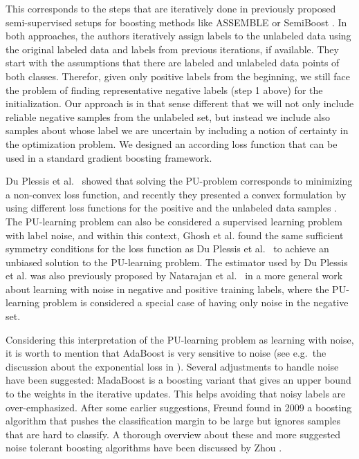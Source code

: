 This corresponds to the steps that are iteratively done in previously proposed semi-supervised setups for boosting methods like ASSEMBLE \cite{bennett2002exploiting} or SemiBoost \cite{mallapragada2009semiboost}. In both approaches, the authors iteratively assign labels to the unlabeled data using the original labeled data and labels from previous iterations, if available. They start with the assumptions that there are labeled and unlabeled data points of both classes. Therefor, given only positive labels from the beginning, we still face the problem of finding representative negative labels (step 1 above) for the initialization. Our approach is in that sense different that we will not only include reliable negative samples from the unlabeled set, but instead we include also samples about whose label we are uncertain by including a notion of certainty in the optimization problem. We designed an according loss function that can be used in a standard gradient boosting framework.

Du Plessis et al.\ \cite{plessis2014PUanalysis} showed that solving the PU-problem corresponds to minimizing a non-convex loss function, and recently they presented a convex formulation by using different loss functions for the positive and the unlabeled data samples \cite{plessis2015convex}. The PU-learning problem can also be considered a supervised learning problem with label noise, and within this context, Ghosh et al. \cite{ghosh2015making} found the same sufficient symmetry conditions for the loss function as Du Plessis et al.\ \cite{plessis2014PUanalysis} to achieve an unbiased solution to the PU-learning problem. The estimator used by Du Plessis et al. was also previously proposed by Natarajan et al.\ \cite{natarajan2013learning} in a more general work about learning with noise in negative and positive training labels, where the PU-learning problem is considered a special case of having only noise in the negative set.

Considering this interpretation of the PU-learning problem as learning with noise, it is worth to mention that AdaBoost is very sensitive to noise (see e.g.\ the discussion about the exponential loss in \cite{friedman2009elements}). Several adjustments to handle noise have been suggested: MadaBoost \cite{domingo2000madaboost} is a boosting variant that gives an upper bound to the weights in the iterative updates. This helps avoiding that noisy labels are over-emphasized. 
After some earlier suggestions, Freund found in 2009 a boosting algorithm \cite{freund2009more} that pushes the classification margin to be large but ignores samples that are hard to classify. A thorough overview about these and more suggested noise tolerant boosting algorithms have been discussed by Zhou \cite{zhou2012ensemble}. 
